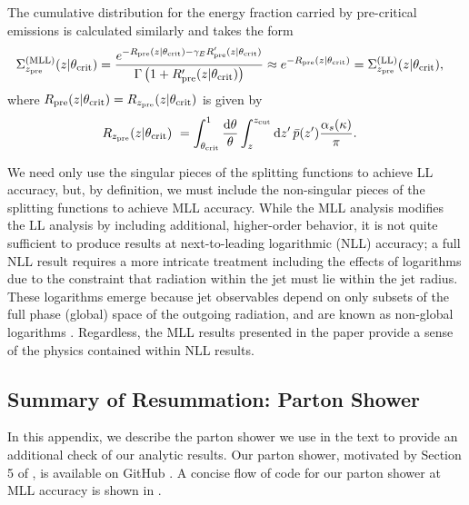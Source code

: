 The cumulative distribution for the energy fraction carried by pre-critical emissions is calculated similarly and takes the form
%
\begin{align}
    \Sigma^{\rm(MLL)}_{z_{\rm pre}}
    (z | \theta_{\rm crit})
    &=
   \frac{
   e^{-R_{\rm pre}(z | \theta_{\rm crit})
   -
   \gamma_E R'_{\rm pre}(z | \theta_{\rm crit})}
   }
   {\Gamma
   \left(1 + R'_{\rm pre}(z | \theta_{\rm crit})\right)
   }
   \approx
   e^{-R_{\rm pre}(z | \theta_{\rm crit})}
   =
   \Sigma^{\rm(LL)}_{z_{\rm pre}}
   (z  |  \theta_{\rm crit})
   \label{eqn:preDist}
   ,
\end{align}
%
where \(R_{\rm pre}(z | \theta_{\rm crit}) = R_{z_{\rm pre}}(z | \theta_{\rm crit})\) is given by
%
\begin{align}
    R_{z_{\rm pre}}
    (z | \theta_{\rm crit})\
    &=
    \int_{\theta_{\rm crit}}^{1}
    \frac{\dd\theta}{\theta}
    \int_{z}^{z_{\rm cut}}\dd z'\,
    \bar{p}(z')
    \frac{\alpha_s(\kappa)}{\pi}
    .
\end{align}

We need only use the singular pieces of the splitting functions to achieve LL accuracy, but, by definition, we must include the non-singular pieces of the splitting functions to achieve MLL accuracy.
%
While the MLL analysis modifies the LL analysis by including additional, higher-order behavior, it is not quite sufficient to produce results at next-to-leading logarithmic (NLL) accuracy;
%
a full NLL result requires a more intricate treatment including the effects of logarithms due to the constraint that radiation within the jet must lie within the jet radius.
%
These logarithms emerge because jet observables depend on only subsets of the full phase (global) space of the outgoing radiation, and are known as non-global logarithms \cite{Dasgupta:2001sh,Dasgupta:2002dc,Dasgupta:2002bw,Banfi:2002hw,Appleby:2002ke,Weigert:2003mm,Rubin:2010fc,Banfi:2010pa,Kelley:2011tj,Hornig:2011iu,Kelley:2011aa,Hatta:2013iba,Schwartz:2014wha,Khelifa-Kerfa:2015mma,Larkoski:2015zka,Larkoski:2016zzc,Banfi:2021owj}.
%
Regardless, the MLL results presented in the paper provide a sense of the physics contained within NLL results.


\subsection{Summary of Resummation: Parton Shower}
\label{app:partonshower}

In this appendix, we describe the parton shower we use in the text to provide an additional check of our analytic results.
%
Our parton shower, motivated by Section 5 of , is available on GitHub \cite{samgithub}.
%
A concise flow of code for our parton shower at MLL accuracy is shown in .

